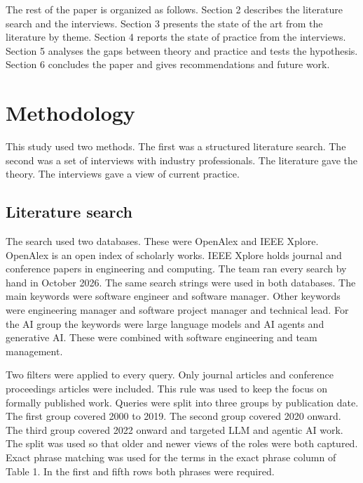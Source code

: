\documentclass[conference]{IEEEtran}
\begin{document}
The rest of the paper is organized as follows. Section 2 describes the literature search and the interviews. Section 3 presents the state of the art from the literature by theme. Section 4 reports the state of practice from the interviews. Section 5 analyses the gaps between theory and practice and tests the hypothesis. Section 6 concludes the paper and gives recommendations and future work.

\section{Methodology}

This study used two methods. The first was a structured literature search. The second was a set of interviews with industry professionals. The literature gave the theory. The interviews gave a view of current practice.

\subsection{Literature search}

The search used two databases. These were OpenAlex and IEEE Xplore. OpenAlex is an open index of scholarly works. IEEE Xplore holds journal and conference papers in engineering and computing. The team ran every search by hand in October 2026. The same search strings were used in both databases. The main keywords were software engineer and software manager. Other keywords were engineering manager and software project manager and technical lead. For the AI group the keywords were large language models and AI agents and generative AI. These were combined with software engineering and team management.

Two filters were applied to every query. Only journal articles and conference proceedings articles were included. This rule was used to keep the focus on formally published work. Queries were split into three groups by publication date. The first group covered 2000 to 2019. The second group covered 2020 onward. The third group covered 2022 onward and targeted LLM and agentic AI work. The split was used so that older and newer views of the roles were both captured. Exact phrase matching was used for the terms in the exact phrase column of Table 1. In the first and fifth rows both phrases were required.
\end{document}
